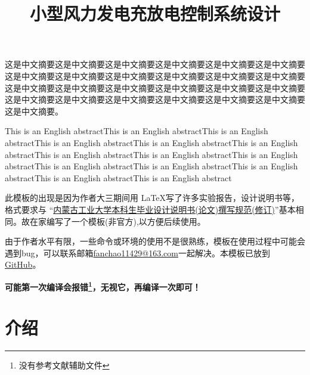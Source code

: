 \documentclass{imutthesis}
\title{小型风力发电充放电控制系统设计}
\begin{document}
\maketitle   %

\begin{cnabstract}
	这是中文摘要这是中文摘要这是中文摘要这是中文摘要这是中文摘要这是中文摘要这是中文摘要这是中文摘要这是中文摘要这是中文摘要这是中文摘要这是中文摘要这是中文摘要这是中文摘要这是中文摘要这是中文摘要这是中文摘要这是中文摘要这是中文摘要这是中文摘要这是中文摘要这是中文摘要这是中文摘要这是中文摘要这是中文摘要。
	
	
\end{cnabstract}

\begin{enabstract}
	This is an English abstractThis is an English abstractThis is an English abstractThis is an English abstractThis is an English abstractThis is an English abstractThis is an English abstractThis is an English abstractThis is an English abstractThis is an English abstractThis is an English abstractThis is an English abstractThis is an English abstractThis is an English abstract
	
	
\end{enabstract}
\tableofcontents    %
\listoffigures     %
\listoftables      %

\begin{introduction}
	此模板的出现是因为作者大三期间用  \LaTeX 写了许多实验报告，设计说明书等，格式要求与
“\href{http://jwch.imut.edu.cn/jwzx/infoSingleArticle.do?articleId=10889&columnId=}{内蒙古工业大学本科生毕业设计说明书(论文)撰写规范(修订)}”基本相同。故在家编写了一个模板(非官方),以方便后续使用。

由于作者水平有限，一些命令或环境的使用不是很熟练，模板在使用过程中可能会遇到bug，可以联系邮箱\url{fanchao11429@163.com}一起解决。本模板已放到\href{https://github.com/Struggle-best/IMUT_thesis}{GitHub}。
\vspace{3cm}

{\bfseries \color{red}可能第一次编译会报错\footnote{没有参考文献辅助文件}，无视它，再编译一次即可！}
\end{introduction}

\chapter{介绍}
\end{document}
